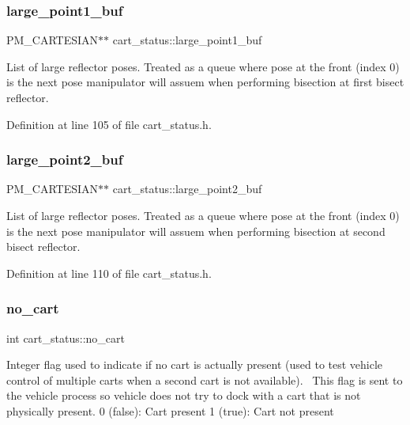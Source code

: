 \subsubsection{\texorpdfstring{large\+\_\+point1\+\_\+buf}{large\_point1\_buf}}
{\footnotesize\ttfamily P\+M\+\_\+\+C\+A\+R\+T\+E\+S\+I\+AN$\ast$$\ast$ cart\+\_\+status\+::large\+\_\+point1\+\_\+buf\hspace{0.3cm}{\ttfamily [private]}}

List of large reflector poses. Treated as a queue where pose at the front (index 0) is the next pose manipulator will assuem when performing bisection at first bisect reflector. 

Definition at line 105 of file cart\+\_\+status.\+h.

\mbox{\label{classcart__status_aff6cd4f5352a807b290381b103d1fa7a}} 
\subsubsection{\texorpdfstring{large\+\_\+point2\+\_\+buf}{large\_point2\_buf}}
{\footnotesize\ttfamily P\+M\+\_\+\+C\+A\+R\+T\+E\+S\+I\+AN$\ast$$\ast$ cart\+\_\+status\+::large\+\_\+point2\+\_\+buf\hspace{0.3cm}{\ttfamily [private]}}

List of large reflector poses. Treated as a queue where pose at the front (index 0) is the next pose manipulator will assuem when performing bisection at second bisect reflector. 

Definition at line 110 of file cart\+\_\+status.\+h.

\mbox{\label{classcart__status_a7ddb73db75439f687289c32c3e10d625}} 
\subsubsection{\texorpdfstring{no\+\_\+cart}{no\_cart}}
{\footnotesize\ttfamily int cart\+\_\+status\+::no\+\_\+cart\hspace{0.3cm}{\ttfamily [private]}}

Integer flag used to indicate if no cart is actually present (used to test vehicle control of multiple carts when a second cart is not available).~\newline
This flag is sent to the vehicle process so vehicle does not try to dock with a cart that is not physically present. 0 (false)\+: Cart present 1 (true)\+: Cart not present 

